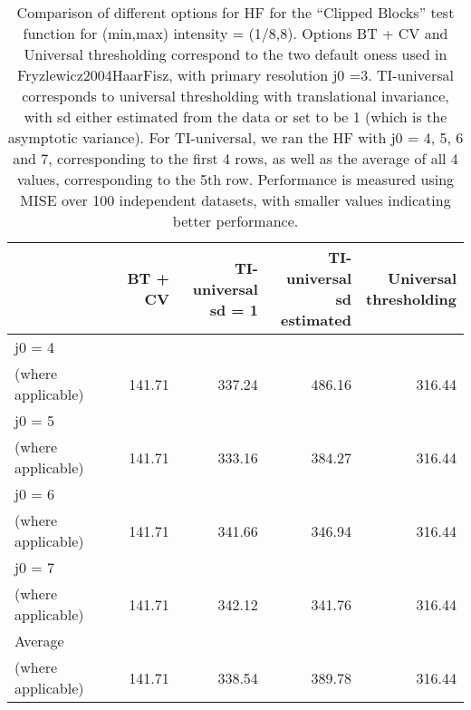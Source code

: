 \documentclass[12pt]{article}
\begin{document}
\begin{table}[ht]
\centering
\begin{tabular}{lrrrr}
  \hline
 & BT + CV & \pbox{20cm}{TI-universal \\ sd = 1} & \pbox{20cm}{TI-universal \\ sd estimated} & \pbox{20cm}{Universal \\ thresholding} \\ 
  \hline
j0 = 4 \\
 (where applicable) & 141.71 & 337.24 & 486.16 & 316.44 \\ 
  j0 = 5 \\
 (where applicable) & 141.71 & 333.16 & 384.27 & 316.44 \\ 
  j0 = 6 \\
 (where applicable) & 141.71 & 341.66 & 346.94 & 316.44 \\ 
  j0 = 7 \\
 (where applicable) & 141.71 & 342.12 & 341.76 & 316.44 \\ 
  Average \\
 (where applicable) & 141.71 & 338.54 & 389.78 & 316.44 \\ 
   \hline
\end{tabular}
\caption{Comparison of different options for HF for the ``Clipped Blocks'' test function for (min,max) intensity = (1/8,8). Options BT + CV and Universal thresholding correspond to the two default oness used in {Fryzlewicz2004HaarFisz}, with primary resolution j0 =3. TI-universal corresponds to universal thresholding with translational invariance, with sd either estimated from the data or set to be 1 (which is the asymptotic variance). For TI-universal, we ran the HF with j0 = 4, 5, 6 and 7, corresponding to the first 4 rows, as well as the average of all 4 values, corresponding to the 5th row. Performance is measured using MISE over 100 independent datasets, with smaller values indicating better performance.} 
\label{table:pois_hf_cb_8}
\end{table}
\end{document}
